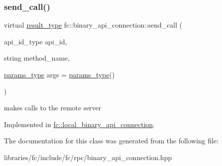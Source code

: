 \subsubsection{\texorpdfstring{send\+\_\+call()}{send\_call()}}
{\footnotesize\ttfamily virtual \mbox{\hyperlink{classstd_1_1vector}{result\+\_\+type}} fc\+::binary\+\_\+api\+\_\+connection\+::send\+\_\+call (\begin{DoxyParamCaption}\item[{api\+\_\+id\+\_\+type}]{api\+\_\+id,  }\item[{string}]{method\+\_\+name,  }\item[{\mbox{\hyperlink{classstd_1_1vector}{params\+\_\+type}}}]{args = {\ttfamily \mbox{\hyperlink{classstd_1_1vector}{params\+\_\+type}}()} }\end{DoxyParamCaption})\hspace{0.3cm}{\ttfamily [pure virtual]}}

makes calls to the remote server 

Implemented in \mbox{\hyperlink{classfc_1_1local__binary__api__connection_afe5ad41916d1118fcb24f14146df9485}{fc\+::local\+\_\+binary\+\_\+api\+\_\+connection}}.



The documentation for this class was generated from the following file\+:\begin{DoxyCompactItemize}
\item 
libraries/fc/include/fc/rpc/binary\+\_\+api\+\_\+connection.\+hpp\end{DoxyCompactItemize}
